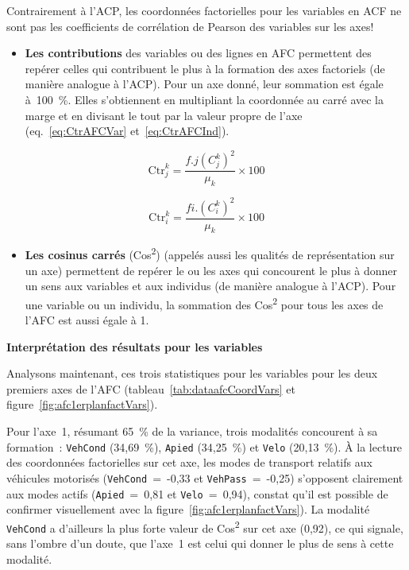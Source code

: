 \documentclass[
  11pt,
  french,
]{book}
\makeatletter
\providecommand{\tightlist}{%
  \setlength{\itemsep}{0pt}\setlength{\parskip}{0pt}}
\newenvironment{kframev}{%
\medskip{}
\setlength{\fboxsep}{.8em}
 \def\at@end@of@kframev{}%
 \ifinner\ifhmode%
  \def\at@end@of@kframev{\end{minipage}}%
  \begin{minipage}{\columnwidth}%
 \fi\fi%
 \def\FrameCommand##1{\hskip\@totalleftmargin \hskip-\fboxsep
 \colorbox{shadebluecolor}{##1}\hskip-\fboxsep
     \hskip-\linewidth \hskip-\@totalleftmargin \hskip\columnwidth}%
 \MakeFramed {\advance\hsize-\width
   \@totalleftmargin\z@ \linewidth\hsize
   \@setminipage}}%
 {\par\unskip\endMakeFramed%
 \at@end@of@kframev}
\newenvironment{rmdblock}[1]
  {
  \begin{itemize}
  \renewcommand{\labelitemi}{
    \raisebox{-.7\height}[0pt][0pt]{
      {\setkeys{Gin}{width=3em,keepaspectratio}\texttt{[image: images/\#1]}}
    }
  }
  \setlength{\fboxsep}{1em}
  \begin{kframev}
  \small
  \item
  }
  {
  \end{kframev}
  \end{itemize}
  }
\newenvironment{bloc_attention}
  {\begin{rmdblock}{attention}}
  {\end{rmdblock}}
\makeatother
\begin{document}
\begin{bloc_attention}
Contrairement à l'ACP, les coordonnées factorielles pour les variables en ACF ne sont pas les coefficients de corrélation de Pearson des variables sur les axes!

\end{bloc_attention}

\begin{itemize}
\tightlist
\item
  \textbf{Les contributions} des variables ou des lignes en AFC permettent des repérer celles qui contribuent le plus à la formation des axes factoriels (de manière analogue à l'ACP). Pour un axe donné, leur sommation est égale à~100~\%. Elles s'obtiennent en multipliant la coordonnée au carré avec la marge et en divisant le tout par la valeur propre de l'axe (eq.~\eqref{eq:CtrAFCVar} et~\eqref{eq:CtrAFCInd}).
\end{itemize}

\footnotesize

\begin{equation}
\mbox{Ctr}_j^k =\frac{f.j(C^k_j)^2}{\mu_{k}}\times 100
\label{eq:CtrAFCVar}
\end{equation}
\normalsize

\footnotesize

\begin{equation}
\mbox{Ctr}_i^k =\frac{fi.(C^k_i)^2}{\mu_{k}}\times 100
\label{eq:CtrAFCInd}
\end{equation}
\normalsize

\begin{itemize}
\tightlist
\item
  \textbf{Les cosinus carrés} (Cos\textsuperscript{2}) (appelés aussi les qualités de représentation sur un axe) permettent de repérer le ou les axes qui concourent le plus à donner un sens aux variables et aux individus (de manière analogue à l'ACP). Pour une variable ou un individu, la sommation des Cos\textsuperscript{2} pour tous les axes de l'AFC est aussi égale à 1.
\end{itemize}

\textbf{Interprétation des résultats pour les variables}

Analysons maintenant, ces trois statistiques pour les variables pour les deux premiers axes de l'AFC (tableau~\ref{tab:dataafcCoordVars} et figure~\ref{fig:afc1erplanfactVars}).

Pour l'axe~1, résumant 65~\% de la variance, trois modalités concourent à sa formation~: \texttt{VehCond} (34,69~\%), \texttt{Apied} (34,25~\%) et \texttt{Velo} (20,13~\%). À la lecture des coordonnées factorielles sur cet axe, les modes de transport relatifs aux véhicules motorisés (\texttt{VehCond}~=~-0,33 et \texttt{VehPass}~=~-0,25) s'opposent clairement aux modes actifs (\texttt{Apied}~=~0,81 et \texttt{Velo}~=~0,94), constat qu'il est possible de confirmer visuellement avec la figure~\ref{fig:afc1erplanfactVars}). La modalité \texttt{VehCond} a d'ailleurs la plus forte valeur de Cos\textsuperscript{2} sur cet axe (0,92), ce qui signale, sans l'ombre d'un doute, que l'axe~1 est celui qui donner le plus de sens à cette modalité.
\end{document}
